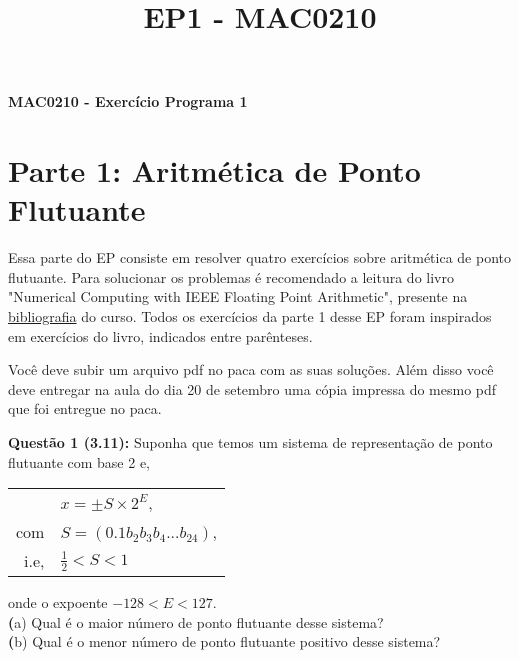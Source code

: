 \documentclass[12pt]{article}
\newcommand{\questao}[1] {\vspace{12pt} \noindent \large \textbf{Questão #1:} \normalsize}
\renewcommand{\part}[1] {\noindent\textbf (#1)}
\begin{document}
\title{EP1 - MAC0210}
\begin{flushleft}
    \textbf{\fontsize{20pt}{2em}\selectfont 
        MAC0210 - Exercício Programa 1\\}
    \fontsize{10pt}{1em}
\end{flushleft}


\section {Parte 1: Aritmética de Ponto Flutuante}
    Essa parte do EP consiste em resolver quatro exercícios sobre 
aritmética de ponto flutuante. Para solucionar os problemas é
recomendado a leitura do livro "Numerical Computing with IEEE Floating
Point Arithmetic", presente na 
\href{http://ime.usp.br/~egbirgin/mac210/biblio.html}{bibliografia} do 
curso. Todos os exercícios da parte 1 desse EP foram inspirados em 
exercícios do livro, indicados entre parênteses.

    Você deve subir um arquivo pdf no paca com as suas soluções.
Além disso você deve entregar na aula do dia 20 de setembro uma 
cópia impressa do mesmo pdf que foi entregue no paca.

\questao{1 (3.11)} 
Suponha que temos um sistema de representação de ponto flutuante com
base 2 e,
\begin{center}
    \begin{tabular}{r l}
             & $x = \pm S \times 2^E$,\\ 
        com  & $S = (0.1b_2b_3b_4...b_{24})$, \\
        i.e, & $\frac{1}{2} < S < 1$
    \end{tabular}
\end{center}
onde o expoente $-128 < E < 127$. \\ 
\part{a} Qual é o maior número de ponto flutuante desse sistema? \\
\part{b} Qual é o menor número de ponto flutuante positivo desse 
sistema? \\
\end{document}
